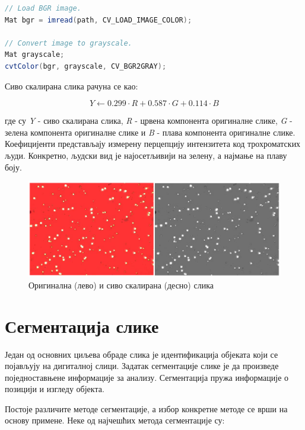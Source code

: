 \documentclass[12pt,a4paper,serbian,oneside]{book}
\begin{document}
\begin{lstlisting}[language=Java,label=lst:grayscale,caption=Рачунање сиво скалиране слике]
// Load BGR image.
Mat bgr = imread(path, CV_LOAD_IMAGE_COLOR);

// Convert image to grayscale.
Mat grayscale;
cvtColor(bgr, grayscale, CV_BGR2GRAY);
\end{lstlisting}

 Сиво скалирана слика рачуна се као:

\begin{equation}
Y \gets 0.299 \cdot R + 0.587 \cdot G + 0.114 \cdot B
\end{equation}

где су \textit{Y} - сиво скалирана слика, \textit{R} - црвена компонента оригиналне слике, \textit{G} - зелена компонента оригиналне слике и \textit{B} - плава компонента оригиналне слике. Коефицијенти представљају измерену перцепцију интензитета код трохроматских људи. Конкретно, људски вид је најосетљивији на зелену, а најмање на плаву боју.

\begin{figure}
\begin{center}
\includegraphics[width=150mm]{images/original+grayscale.png}
\end{center}
\caption{Оригинална (лево) и сиво скалирана (десно) слика}
\label{fig:cv}
\end{figure}

\newpage

\section{Сегментација слике}

Један од основних циљева обраде слика је идентификација објеката који се појављују на дигиталној слици. Задатак сегментације слике је да произведе поједноставњене информације за анализу. Сегментација пружа информације о позицији и изгледу објекта.

Постоје различите методе сегментације, а избор конкретне методе се врши на основу примене. Неке од најчешћих метода сегментације су:
\end{document}
